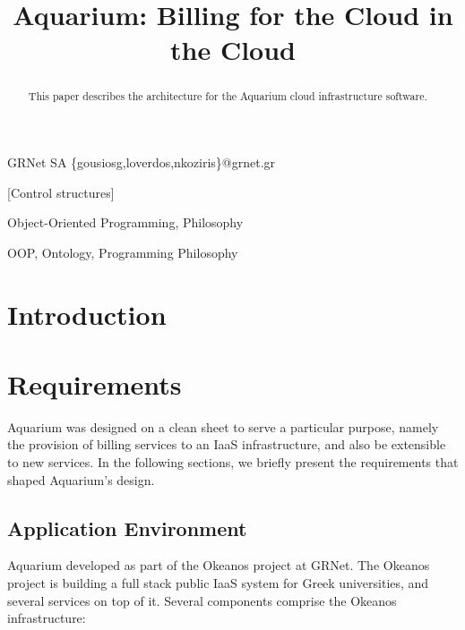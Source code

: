 \documentclass[preprint,10pt]{sigplanconf}
\begin{document}




\title{Aquarium: Billing for the Cloud in the Cloud}

{GRNet SA}
{\{gousiosg,loverdos,nkoziris\}@grnet.gr}

\maketitle
\begin{abstract}
    This paper describes the architecture for the Aquarium cloud infrastructure
    software.
\end{abstract}

[Control structures]

\terms
    Object-Oriented Programming, Philosophy

\keywords
    OOP, Ontology, Programming Philosophy

\section{Introduction}
\section{Requirements}

Aquarium was designed on a clean sheet to serve a particular purpose,
namely the provision of billing services to an IaaS infrastructure,
and also be extensible to new services. In the following sections,
we briefly present the requirements that shaped Aquarium's design.

\subsection{Application Environment}
Aquarium developed as part of the Okeanos project at GRNet. The
Okeanos project is building a full stack public IaaS system for Greek
universities, and several services on top of it. Several components comprise
the Okeanos infrastructure:
\end{document}
